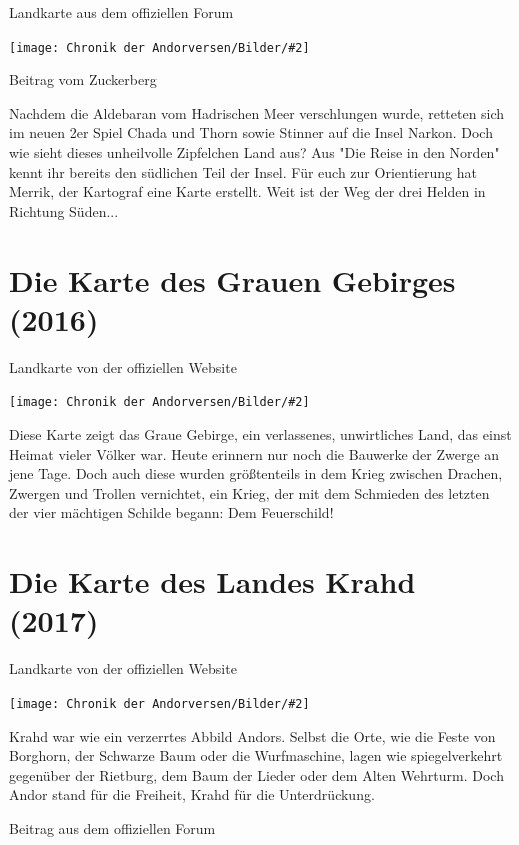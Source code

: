\documentclass[10pt, a4paper, oneside]{book}
\newcommand{\produkt}[1]{%
    \section{#1}%
    \label{Produkt: #1}%
}
\newcommand{\bildmitts}[2][height=0.32\textwidth,width=0.48\textwidth,keepaspectratio]{%
    \begin{center}
        \texttt{[image: Chronik der Andorversen/Bilder/\#2]}
    \end{center}
}
\begin{document}
\begin{center}
    Landkarte aus dem offiziellen Forum
\end{center}

\bildmitts[width=0.9\textwidth]{Die Karte von Narkon.jpeg}

\begin{center}
    Beitrag vom Zuckerberg
\end{center}

Nachdem die Aldebaran vom Hadrischen Meer verschlungen wurde, retteten sich im neuen 2er Spiel Chada und Thorn sowie Stinner auf die Insel Narkon. Doch wie sieht dieses unheilvolle Zipfelchen Land aus? Aus "Die Reise in den Norden" kennt ihr bereits den südlichen Teil der Insel. Für euch zur Orientierung hat Merrik, der Kartograf eine Karte erstellt. Weit ist der Weg der drei Helden in Richtung Süden...


\newpage
\produkt{Die Karte des Grauen Gebirges (2016)}

\begin{center}
    Landkarte von der offiziellen Website
\end{center}

\bildmitts[width=\textwidth]{Die Karte des Grauen Gebirges.jpg}

Diese Karte zeigt das Graue Gebirge, ein verlassenes, unwirtliches Land, das einst Heimat vieler Völker war. Heute erinnern nur noch die Bauwerke der Zwerge an jene Tage. Doch auch diese wurden größtenteils in dem Krieg zwischen Drachen, Zwergen und Trollen vernichtet, ein Krieg, der mit dem Schmieden des letzten der vier mächtigen Schilde begann: Dem Feuerschild!

\newpage
\produkt{Die Karte des Landes Krahd (2017)}

\begin{center}
    Landkarte von der offiziellen Website
\end{center}

\bildmitts[width=\textwidth]{Die Karte des Landes Krahd.jpg}

Krahd war wie ein verzerrtes Abbild Andors. Selbst die Orte, wie die Feste von Borghorn, der Schwarze Baum oder die Wurfmaschine, lagen wie spiegelverkehrt gegenüber der Rietburg, dem Baum der Lieder oder dem Alten Wehrturm. Doch Andor stand für die Freiheit, Krahd für die Unterdrückung.

\begin{center}
    Beitrag aus dem offiziellen Forum
\end{center}
\end{document}
